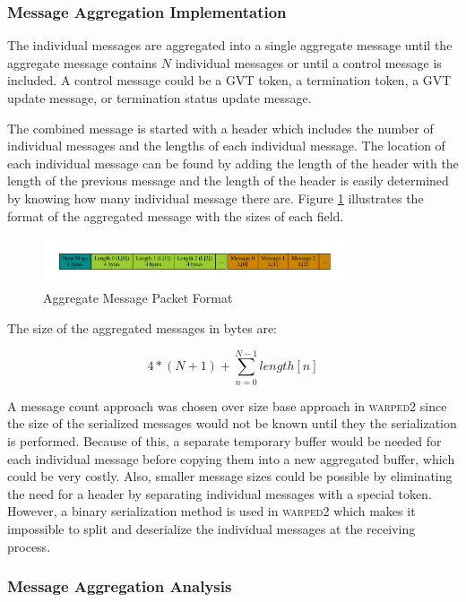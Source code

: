 \documentclass[11pt]{book}
\begin{document}
\subsubsection{Message Aggregation Implementation}

The individual messages are aggregated into a single aggregate message until the aggregate message
contains $N$ individual messages or until a control message is included.  A control message could be
a GVT token, a termination token, a GVT update message, or termination status update message.

The combined message is started with a header which includes the number of individual messages and
the lengths of each individual message.  The location of each individual message can be found by
adding the length of the header with the length of the previous message and the length of the header
is easily determined by knowing how many individual message there are.  Figure
\ref{aggregate_format} illustrates the format of the aggregated message with the sizes of each
field.

\begin{figure}
    \centering
    \includegraphics[width=0.8\textwidth,quiet]{figs/graphviz/aggregation_format.pdf}
    \caption{Aggregate Message Packet Format}\label{aggregate_format}
\end{figure}

\noindent
The size of the aggregated messages in bytes are:

$$ 4 * (N + 1) + \sum_{n=0}^{N-1} length[n] $$

\noindent
A message count approach was chosen over size base approach in \textsc{warped2} since the size of
the serialized messages would not be known until they the serialization is performed.  Because of
this, a separate temporary buffer would be needed for each individual message before copying them
into a new aggregated buffer, which could be very costly.  Also, smaller message sizes could be
possible by eliminating the need for a header by separating individual messages with a special
token.  However, a binary serialization method is used in \textsc{warped2} which makes it impossible
to split and deserialize the individual messages at the receiving process.

\subsubsection{Message Aggregation Analysis}
\end{document}
